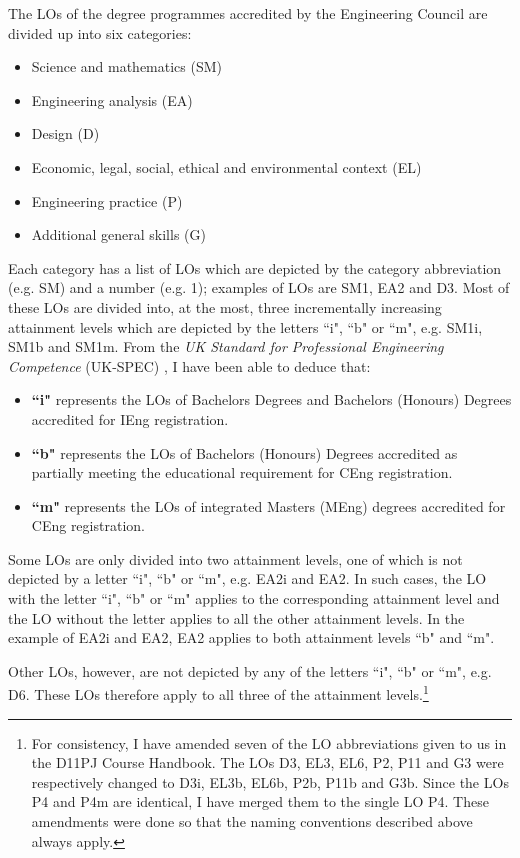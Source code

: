 The LOs of the degree programmes accredited by the Engineering Council are divided up into six categories:
\begin{itemize}
    \item Science and mathematics (SM)
    \item Engineering analysis (EA)
    \item Design (D)
    \item Economic, legal, social, ethical and environmental context (EL)
    \item Engineering practice (P)
    \item Additional general skills (G)
\end{itemize}
Each category has a list of LOs which are depicted by the category abbreviation (e.g. SM) and a number (e.g. 1); examples of LOs are SM1, EA2 and D3.
Most of these LOs are divided into, at the most, three incrementally increasing attainment levels which are depicted by the letters ``i", ``b" or ``m", e.g. SM1i, SM1b and SM1m.
From the \textit{UK Standard for Professional Engineering Competence} (UK-SPEC) \citep{EngineeringCouncil2014}, 
I have been able to deduce that:
\begin{itemize}
    \item \textbf{``i"} represents the LOs of Bachelors Degrees and Bachelors (Honours) Degrees accredited for IEng registration.
    \item \textbf{``b"} represents the LOs of Bachelors (Honours) Degrees accredited as partially meeting the educational requirement for CEng registration.
    \item \textbf{``m"} represents the LOs of integrated Masters (MEng) degrees accredited for CEng registration.
\end{itemize}

Some LOs are only divided into two attainment levels, one of which is not depicted by a letter ``i", ``b" or ``m", e.g. EA2i and EA2.
In such cases, the LO with the letter ``i", ``b" or ``m" applies to the corresponding attainment level and the LO without the letter applies to all the other attainment levels.
In the example of EA2i and EA2, EA2 applies to both attainment levels ``b" and ``m".

Other LOs, however, are not depicted by any of the letters ``i", ``b" or ``m", e.g. D6.
These LOs therefore apply to all three of the attainment levels.\footnote{
For consistency, I have amended seven of the LO abbreviations given to us in the D11PJ Course Handbook.
The LOs D3, EL3, EL6, P2, P11 and G3 were respectively changed to D3i, EL3b, EL6b, P2b, P11b and G3b.
Since the LOs P4 and P4m are identical, I have merged them to the single LO P4.
These amendments were done so that the naming conventions described above always apply.}

